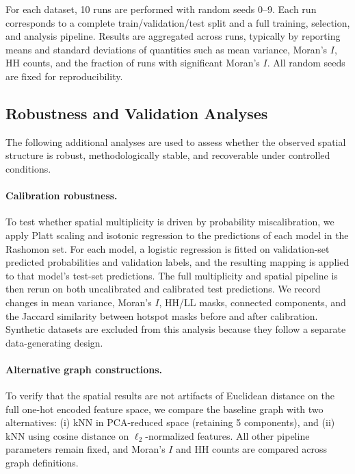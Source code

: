For each dataset, 10 runs are performed with random seeds 0--9. Each run
corresponds to a complete train/validation/test split and a full training, selection, and
analysis pipeline. Results are aggregated across runs, typically by reporting means and
standard deviations of quantities such as mean variance, Moran's $I$, HH counts, and the
fraction of runs with significant Moran's $I$. All random seeds are fixed for reproducibility.


\subsection{Robustness and Validation Analyses}

The following additional analyses are used to assess whether the observed spatial structure
is robust, methodologically stable, and recoverable under controlled conditions.

\paragraph{Calibration robustness.}
\label{sec:exp-calibration}
To test whether spatial multiplicity is driven by probability miscalibration, we apply Platt
scaling and isotonic regression to the predictions of each model in the Rashomon set. For each model, a logistic
regression is fitted on validation-set predicted probabilities and validation labels, and the
resulting mapping is applied to that model's test-set predictions. The full multiplicity and
spatial pipeline is then rerun on both uncalibrated and calibrated test predictions. We
record changes in mean variance, Moran's $I$, HH/LL masks, connected components, and
the Jaccard similarity between hotspot masks before and after calibration. Synthetic
datasets are excluded from this analysis because they follow a separate data-generating
design.

\paragraph{Alternative graph constructions.}
To verify that the spatial results are not artifacts of Euclidean distance on the full one-hot
encoded feature space, we compare the baseline graph with two alternatives:
(i) kNN in PCA-reduced space (retaining 5 components), and
(ii) kNN using cosine distance on $\ell_2$-normalized features. All other pipeline
parameters remain fixed, and Moran's $I$ and HH counts are compared across graph
definitions.

